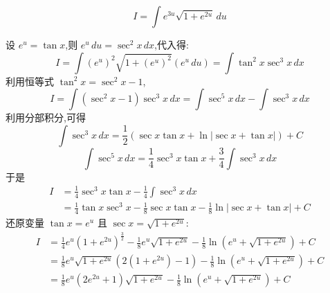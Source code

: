 \begin{questions}
    \question
    \[
    I = \int e^{3u} \sqrt{1 + e^{2u}} \, du
    \]
    \begin{solution}
        设 $e^u = \tan x$,则 $e^u \, du = \sec^2 x \, dx$,代入得:
        \[
        I = \int (e^u)^2 \sqrt{1 + (e^u)^2} (e^u \, du) = \int \tan^2 x \sec^3 x \, dx
        \]
        利用恒等式 $\tan^2 x = \sec^2 x - 1$,
        \[
        I = \int (\sec^2 x - 1) \sec^3 x \, dx = \int \sec^5 x \, dx - \int \sec^3 x \, dx
        \]
        利用分部积分,可得
        \[
        \int \sec^3 x \, dx = \frac{1}{2} (\sec x \tan x + \ln|\sec x + \tan x|) + C
        \]
        \[
        \int \sec^5 x \, dx = \frac{1}{4} \sec^3 x \tan x + \frac{3}{4} \int \sec^3 x \, dx
        \]
        于是
        \begin{align*}
        I &= \frac{1}{4} \sec^3 x \tan x - \frac{1}{4} \int \sec^3 x \, dx \\
        &= \frac{1}{4} \tan x \sec^3 x - \frac{1}{8} \sec x \tan x - \frac{1}{8} \ln|\sec x + \tan x| + C
        \end{align*}
        还原变量 $\tan x = e^u$ 且 $\sec x = \sqrt{1 + e^{2u}}$:
        \begin{align*}
        I &= \frac{1}{4} e^u (1+e^{2u})^{\frac{3}{2}} - \frac{1}{8} e^u \sqrt{1+e^{2u}} - \frac{1}{8} \ln(e^u + \sqrt{1+e^{2u}}) + C \\
        &= \frac{1}{8} e^u \sqrt{1+e^{2u}} (2(1+e^{2u}) - 1) - \frac{1}{8} \ln(e^u + \sqrt{1+e^{2u}}) + C \\
        &= \frac{1}{8} e^u (2e^{2u} + 1) \sqrt{1+e^{2u}} - \frac{1}{8} \ln(e^u + \sqrt{1+e^{2u}}) + C
        \end{align*}
    \end{solution}


\end{questions}
